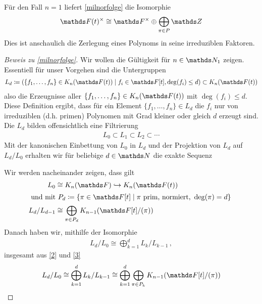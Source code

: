 \documentclass[ngerman,fontsize=11pt, paper=a4, parskip=half, titlepage=true, toc=bib]{scrartcl}
\begin{document}
\begin{Bem}
  Für den Fall $n=1$ liefert \ref{milnorfolge} die Isomorphie
  \begin{gather*}
    \Ft^\times
    \cong \Fx
    \oplus\bigoplus_{\pi\in P}\Z
  \end{gather*}
  Dies ist anschaulich die Zerlegung eines
  Polynoms in seine irreduziblen Faktoren.
\end{Bem}
\begin{proof}[Beweis zu \ref{milnorfolge}]
  Wir wollen die Gültigkeit für $n\in\N_1$ zeigen.
  Essentiell für unser Vorgehen sind die Untergruppen
  \begin{gather*}
    L_d\coloneqq \left(
      \{f_1,\dotsc,f_n\}\in\KnFt 
      \mid f_i\in\F[t],\deg(f_i)\leq d
    \right)
    \subset\KnFt
  \end{gather*}
  also die Erzeugnisse aller $\{f_1,\dotsc,f_n\}\in\KnFt$ mit
  $\deg(f_i)\leq d$. 
  Diese Definition ergibt, dass für ein 
  Element $\{f_1,\dotsc,f_n\}\in L_d$ die $f_i$ nur von 
  irreduziblen (d.h. primen) Polynomen mit
  Grad kleiner oder gleich $d$ erzeugt sind.
  Die $L_d$ bilden offensichtlich eine Filtrierung
  \begin{gather*}
    L_0\subset L_1\subset L_2\subset \dotsb
  \end{gather*}
  Mit der kanonischen Einbettung von $L_0$ in $L_d$ und der Projektion
  von $L_d$ auf $L_d/L_0$ erhalten wir für
  beliebige $d\in\N$ die exakte Sequenz
  \begin{center}
  \end{center}
  Wir werden nacheinander zeigen, dass gilt
  \begin{align}
    L_0&\cong \KnF\hookrightarrow \KnFt  \label{1}\\
    \intertext{
    und mit $P_d\coloneqq \left\{
    \pi\in \F[t]\mid \pi\text{ prim, normiert, }\deg(\pi)=d
    \right\}$
    }
    L_d/L_{d-1}&\cong \bigoplus_{\pi\in P_d} \K_{n-1}(\Ftpi)\label{2}
  \end{align}
  Danach haben wir, mithilfe der Isomorphie
  \begin{gather} \label{3}
    L_d/L_0\cong \bigoplus_{k=1}^d L_k/L_{k-1} \,,
  \end{gather}
  insgesamt aus \eqref{2} und \eqref{3}
  \begin{align}\label{4}
    L_d/L_0
    \cong \bigoplus_{k=1}^d L_k/L_{k-1}
    \cong \bigoplus_{k=1}^d\bigoplus_{\pi\in P_k} \K_{n-1}(\Ftpi)

\end{align}
\end{proof}
\end{document}
